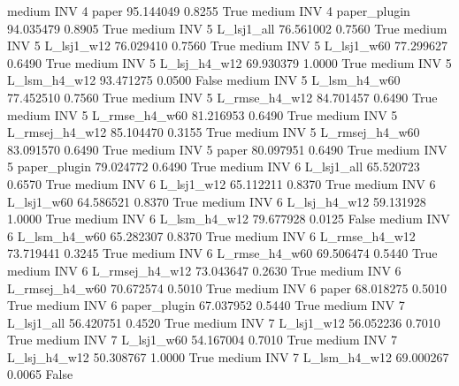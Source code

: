     medium      INV                 4          paper  95.144049      0.8255    True
    medium      INV                 4   paper_plugin  94.035479      0.8905    True
    medium      INV                 5     L_lsj1_all  76.561002      0.7560    True
    medium      INV                 5     L_lsj1_w12  76.029410      0.7560    True
    medium      INV                 5     L_lsj1_w60  77.299627      0.6490    True
    medium      INV                 5   L_lsj_h4_w12  69.930379      1.0000    True
    medium      INV                 5   L_lsm_h4_w12  93.471275      0.0500   False
    medium      INV                 5   L_lsm_h4_w60  77.452510      0.7560    True
    medium      INV                 5  L_rmse_h4_w12  84.701457      0.6490    True
    medium      INV                 5  L_rmse_h4_w60  81.216953      0.6490    True
    medium      INV                 5 L_rmsej_h4_w12  85.104470      0.3155    True
    medium      INV                 5 L_rmsej_h4_w60  83.091570      0.6490    True
    medium      INV                 5          paper  80.097951      0.6490    True
    medium      INV                 5   paper_plugin  79.024772      0.6490    True
    medium      INV                 6     L_lsj1_all  65.520723      0.6570    True
    medium      INV                 6     L_lsj1_w12  65.112211      0.8370    True
    medium      INV                 6     L_lsj1_w60  64.586521      0.8370    True
    medium      INV                 6   L_lsj_h4_w12  59.131928      1.0000    True
    medium      INV                 6   L_lsm_h4_w12  79.677928      0.0125   False
    medium      INV                 6   L_lsm_h4_w60  65.282307      0.8370    True
    medium      INV                 6  L_rmse_h4_w12  73.719441      0.3245    True
    medium      INV                 6  L_rmse_h4_w60  69.506474      0.5440    True
    medium      INV                 6 L_rmsej_h4_w12  73.043647      0.2630    True
    medium      INV                 6 L_rmsej_h4_w60  70.672574      0.5010    True
    medium      INV                 6          paper  68.018275      0.5010    True
    medium      INV                 6   paper_plugin  67.037952      0.5440    True
    medium      INV                 7     L_lsj1_all  56.420751      0.4520    True
    medium      INV                 7     L_lsj1_w12  56.052236      0.7010    True
    medium      INV                 7     L_lsj1_w60  54.167004      0.7010    True
    medium      INV                 7   L_lsj_h4_w12  50.308767      1.0000    True
    medium      INV                 7   L_lsm_h4_w12  69.000267      0.0065   False

